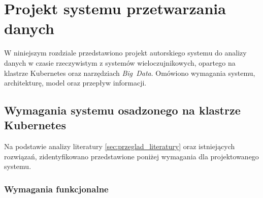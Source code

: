 \section{Projekt systemu przetwarzania danych}
\label{sec:projekt_systemu}

W niniejszym rozdziale przedstawiono projekt autorskiego systemu do analizy danych w czasie rzeczywistym z systemów wieloczujnikowych, opartego na klastrze Kubernetes oraz narzędziach \mbox{\textit{Big Data}}. Omówiono wymagania systemu, architekturę, model oraz przepływ informacji.

\subsection{Wymagania systemu osadzonego na klastrze Kubernetes}
\label{subsec:wymagania}

Na podstawie analizy literatury \ref{sec:przeglad_literatury} oraz istniejących rozwiązań, zidentyfikowano przedstawione poniżej wymagania dla projektowanego systemu.

\subsubsection{Wymagania funkcjonalne}
\label{subsubsec:wymagania_funkcjonalne}

